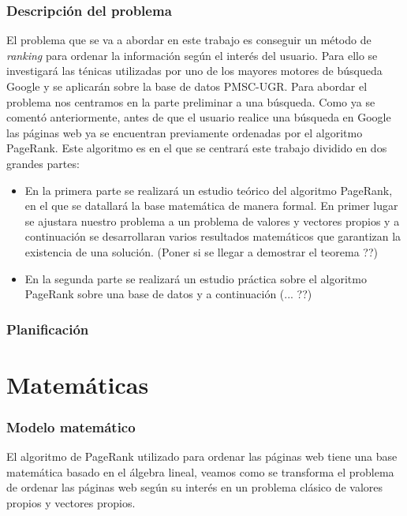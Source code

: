 \documentclass[size=a4, parskip=half, titlepage=false, toc=flat, toc=bib, 12pt]{scrartcl}
\theoremstyle{theorem-style}
\theoremstyle{definition-style}
\theoremstyle{remark-style}
\theoremstyle{example-style}
\theoremstyle{definition-style}
\theoremstyle{remark-style}
\begin{document}
\begin{itemize}
\end{itemize}

\newpage

\section{Descripción del problema}
El problema que se va a abordar en este trabajo es conseguir un método de \textit{ranking} para ordenar la información según el interés del usuario. Para ello se investigará las ténicas utilizadas por uno de los mayores motores de búsqueda Google y se aplicarán sobre la base de datos PMSC-UGR. Para abordar el problema nos centramos en la parte preliminar a una búsqueda. Como ya se comentó anteriormente, antes de que el usuario realice una búsqueda en Google las páginas web ya se encuentran previamente ordenadas por el algoritmo PageRank. Este algoritmo  es en el que se centrará este trabajo dividido en dos grandes partes:
\begin{itemize}
\item En la primera parte se realizará un estudio teórico del algoritmo PageRank, en el que se datallará la base matemática de manera formal. En primer lugar se ajustara nuestro problema a un problema de valores y vectores propios y a continuación se desarrollaran varios resultados matemáticos que garantizan la existencia de una solución. (Poner si se llegar a demostrar el teorema ??)
\item En la segunda parte se realizará un estudio práctica sobre el algoritmo PageRank sobre una base de datos y a continuación (... ??)
\end{itemize}

\section{Planificación}

\newpage

\part{Matemáticas}

\section{Modelo matemático}

El algoritmo de PageRank utilizado para ordenar las páginas web tiene una base matemática basado en el álgebra lineal, veamos como se transforma el problema de ordenar las páginas web según su interés en un problema clásico de valores propios y vectores propios.
\end{document}
